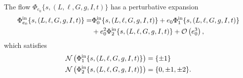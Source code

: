 \begin{lemma}\label{lemma:FLowExpansion}
  The flow  $\Phi_{e_0}\{s,(L,\ell,G,g,I,t)\}$ has a perturbative expansion
  \[
\begin{split}
  \Phi_{e_0}^{\mathrm{in}}\{s,(L,\ell,G,g,I,t)\}=&\Phi_0^{\mathrm{in}}\{s,(L,\ell,G,g,I,t)\}+e_0 \Phi_1^{\mathrm{in}}\{s,(L,\ell,G,g,I,t)\}\\
&+e_0^2\Phi_2^{\mathrm{in}}\{s,(L,\ell,G,g,I,t)\}+\mathcal{O}\left(e_0^3\right),
\end{split}
  \]
  which satisfies
  \begin{align}
    \mathcal{N}\left(\Phi_1^{\mathrm{in}}\{s,(L,\ell,G,g,I,t)\}\right)&=\{\pm 1\}\label{eq:Flow:1:Harmonics}\\
    \mathcal{N}\left(\Phi_2^{\mathrm{in}}\{s,(L,\ell,G,g,I,t)\}\right)&=\{0,\pm 1,\pm 2\}.\label{eq:Flow:2:Harmonics}
  \end{align}
\end{lemma}
